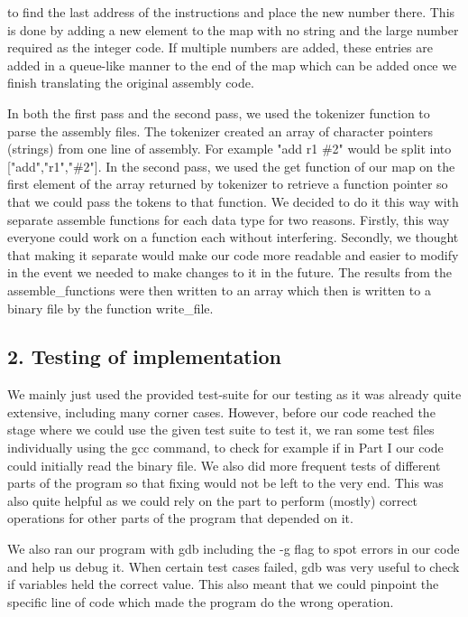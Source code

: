 \documentclass[a4paper]{article}
\begin{document}
to find the last address of the instructions and place the new number there. This is done by adding a new element
to the map with no string and the large number required as the integer code. If multiple numbers are added,
these entries are added in a queue-like manner to the end of the map which can be added once we finish 
translating the original assembly code.
\par
In both the first pass and the second pass, we used the tokenizer function to parse the assembly files. The tokenizer
created an array of character pointers (strings) from one line of assembly. For example "add r1 \#2" would be split
into ["add","r1","\#2"]. In the second pass, we used the get function of our map on the first element of the array
returned by tokenizer to retrieve a function pointer so that we could pass the tokens to that function. We decided
to do it this way with separate assemble functions for each data type for two reasons. Firstly, this way everyone
could work on a function each without interfering. Secondly, we thought that making it separate would make our
code more readable and easier to modify in the event we needed to make changes to it in the future. The results from
the assemble{\_}functions were then written to an array which then is written to a binary file by the function write{\_}file.


\bigskip
\bigskip

\subsection*{2. Testing of implementation}
We mainly just used the provided test-suite for our testing as it was already quite extensive, including many corner cases. 
However, before our code reached the stage where we could use the given test suite to test it, we ran some test files individually 
using the gcc command, to check for example if in Part I our code could initially read the binary file. We also did more frequent 
tests of different parts of the program so that fixing would not be left to the very end. This was also quite helpful as we could
rely on the part to perform (mostly) correct operations for other parts of the program that depended on it. 

We also ran our program with gdb including the -g flag to spot errors in our code and help us debug it. When certain test cases failed,
gdb was very useful to check if variables held the correct value. This also meant that we could pinpoint the specific line of code
which made the program do the wrong operation.
\end{document}
